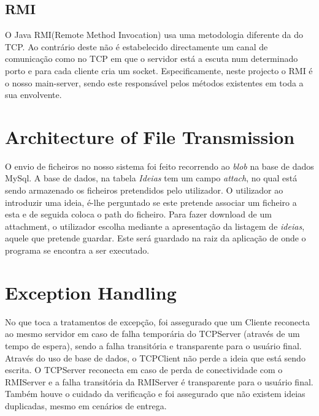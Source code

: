 \documentclass[12pt]{article} %
\begin{document}
\subsection{RMI}
O Java RMI(Remote Method Invocation) usa uma metodologia diferente da do TCP. Ao contrário deste não é estabelecido directamente um canal de comunicação como no TCP em que o servidor está a escuta num determinado porto e para cada cliente cria um socket.
Especificamente, neste projecto o RMI é o nosso main-server, sendo este responsável pelos métodos existentes em toda a sua envolvente.



\section{Architecture of File Transmission}
\label{sec:archi}
O envio de ficheiros no nosso sistema foi feito recorrendo ao \emph{blob} na base de dados MySql. A base de dados, na tabela \emph{Ideias} tem um campo \emph{attach}, no qual está sendo armazenado os ficheiros pretendidos pelo utilizador. O utilizador ao introduzir uma ideia, é-lhe perguntado se este pretende associar um ficheiro a esta e de seguida coloca o path do ficheiro. Para fazer download de um attachment, o utilizador escolha mediante a apresentação da listagem de \emph{ideias}, aquele que pretende guardar. Este será guardado na raiz da aplicação de onde o programa se encontra a ser executado.


\section{Exception Handling}
\label{sec:except}

No que toca a tratamentos de excepção, foi assegurado que um Cliente reconecta ao mesmo servidor em caso de falha temporária do TCPServer (através de um tempo de espera), sendo a falha transitória e transparente para o usuário final.
Através do uso de base de dados, o TCPClient não perde a ideia que está sendo escrita.
O TCPServer reconecta em caso de perda de conectividade com o RMIServer e 
a falha transitória da RMIServer é transparente para o usuário final.
Também houve o cuidado da verificação e foi assegurado que não existem ideias duplicadas, mesmo em cenários de entrega.
\end{document}
